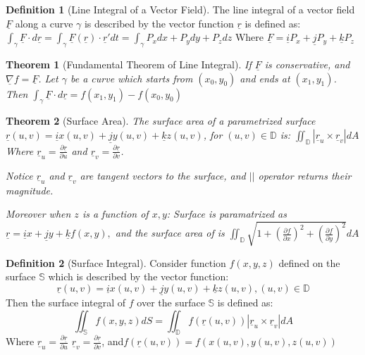 \documentclass[9pt]{article}
\newtheorem{theorem}{Theorem}[subsection]
\theoremstyle{definition}
\newtheorem{definition}{Definition}[section]
\theoremstyle{remark}
\begin{document}
\begin{definition}[Line Integral of a Vector Field]
	The line integral of a vector field $\underline{F}$ along a curve $\gamma$ is described by the vector function $ \underline{r}$ is defined as:
$
	\int_\gamma \underline{F} \cdot d\underline{r} 
	=	 \int_{\gamma} \underline{F} (\underline{r}) \cdot \underline{r}'dt
	= \int_{\gamma} P_x dx + P_y dy + P_z dz
$
Where $ \underline{F} = \underline{i} P_x + \underline{j} P_y +  \underline{k} P_z$
\end{definition}

\begin{theorem}[Fundamental Theorem of Line Integral]
If $\underline{F}$ is conservative, and $ \underline{\nabla}f = \underline{F}$. 
Let $\gamma$ be a curve which starts from $(x_0, y_0)$ and ends at $(x_1, y_1)$.
Then
$
\int _\gamma \underline{F} \cdot d\underline{r} = f(x_1, y_1) - f(x_0, y_0)
$
\end{theorem}

\begin{theorem}[Surface Area]
The surface area of a parametrized surface $\underline{r}(u,v) = \underline{i}x(u,v) + \underline{j}y(u,v) + \underline{k}z(u,v)$, for $(u,v) \in \mathbb{D}$ is:
$
	\iint_{\mathbb{D}} | \underline{r}_u \times \underline{r}_v | dA
$
Where $ \underline{r}_u = \frac{\partial \underline{r}}{\partial u}$ 
and $ \underline{r}_v = \frac{\partial \underline{r}}{\partial v}$. 

Notice $ \underline{r}_u $ and $ \underline{r}_v $ are tangent vectors to the surface, and $||$ operator returns their magnitude.

Moreover when $z$ is a function of $x, y$:
Surface is paramatrized as $ \underline{r} = \underline{i}x+ \underline{j}y+ \underline{k} f(x,y),$ and the surface area of is 
$
	\iint_{ \mathbb{D}} \sqrt{1 + \left( \frac{\partial f}{\partial x} \right)^2 + \left( \frac{\partial f}{\partial y} \right)^2} dA
$
\end{theorem}


\begin{definition}[Surface Integral]
	Consider function $f(x,y,z)$ defined on the surface $ \mathbb{S}$ which is described by the vector function: 
	\[
		\underline{r}(u,v) = \underline{i}x(u,v) + \underline{j}y(u,v) + \underline{k}z(u,v), (u, v) \in \mathbb{D}
	\]
	Then the surface integral of $f$ over the surface $\mathbb{S}$ is defined as:
	\[
		\iint_{\mathbb{S}} f(x,y,z) dS
	=
		\iint_{\mathbb{D}} f( \underline{r}(u,v)) | \underline{r}_u \times \underline{r}_v | dA
	\]
Where $ \underline{r}_u = \frac{\partial \underline{r}}{\partial u}$
$ \underline{r}_v = \frac{\partial \underline{r}}{\partial v}$,
and$f( \underline{r}(u,v)) = f(x(u,v), y(u,v), z(u,v))$
\end{definition}
\end{document}
